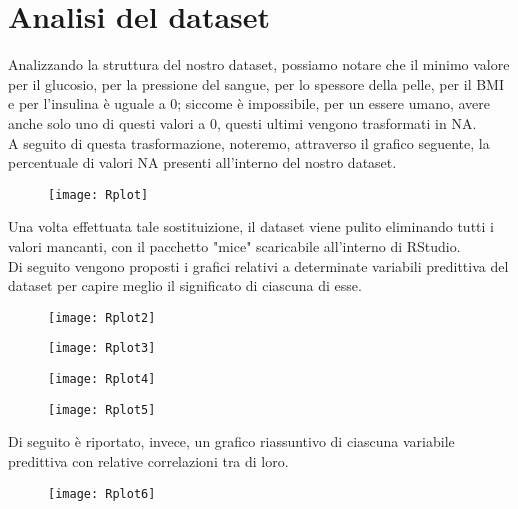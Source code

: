 \section{Analisi del dataset}
Analizzando la struttura del nostro dataset, possiamo notare che il minimo valore per il glucosio, per la pressione del sangue, per lo spessore della pelle, per il BMI e per l'insulina è uguale a 0; siccome è impossibile, per un essere umano, avere anche solo uno di questi valori a 0, questi ultimi vengono trasformati in NA.\\
A seguito di questa trasformazione, noteremo, attraverso il grafico seguente, la percentuale di valori NA presenti all'interno del nostro dataset.

\begin{figure}[H]
	\centering
	\texttt{[image: Rplot]}
\end{figure}

Una volta effettuata tale sostituizione, il dataset viene pulito eliminando tutti i valori mancanti, con il pacchetto "mice" scaricabile all'interno di RStudio.\\

Di seguito vengono proposti i grafici relativi a determinate variabili predittiva del dataset per capire meglio il significato di ciascuna di esse.

\begin{figure}[H]
	\centering
	\texttt{[image: Rplot2]}
\end{figure}

\begin{figure}[H]
	\centering
	\texttt{[image: Rplot3]}
\end{figure}

\begin{figure}[H]
	\centering
	\texttt{[image: Rplot4]}
\end{figure}

\begin{figure}[H]
	\centering
	\texttt{[image: Rplot5]}
\end{figure}

\newpage

Di seguito è riportato, invece, un grafico riassuntivo di ciascuna variabile predittiva con relative correlazioni tra di loro.

\begin{figure}[H]
	\centering
	\texttt{[image: Rplot6]}
\end{figure}

